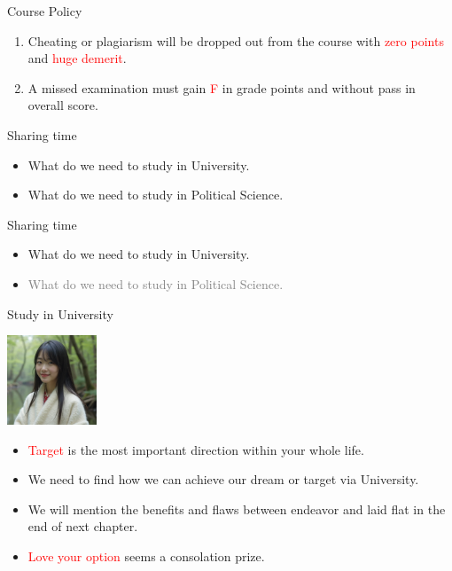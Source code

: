 \documentclass{beamer}
\begin{document}
\begin{frame}{Course Policy}
\begin{enumerate}
\item Cheating or plagiarism will be dropped out from the course with \textcolor{red}{zero points} and \textcolor{red}{huge demerit}. \\
\item A missed examination must gain \textcolor{red}{F} in grade points and without pass in overall score. 
\end{enumerate}
\end{frame}
\begin{frame}{Sharing time}
\begin{itemize}
\item What do we need to study in University.
\item What do we need to study in Political Science.
\end{itemize}
\end{frame}
\begin{frame}{Sharing time}
\begin{itemize}
\item What do we need to study in University.
\item \textcolor{gray}{What do we need to study in Political Science.}
\end{itemize}
\end{frame}
\begin{frame}{Study in University}
\begin{center}
\includegraphics[width=0.2\textwidth]{target.png}
\end{center}
\begin{itemize}
\item \textcolor{red}{Target} is the most important direction within your whole life.
\item We need to find how we can achieve our dream or target via University.
\item We will mention the benefits and flaws between endeavor and laid flat in the end of next chapter.
\item \textcolor{red}{Love your option} seems a consolation prize.
\end{itemize}
\end{frame}
\end{document}
